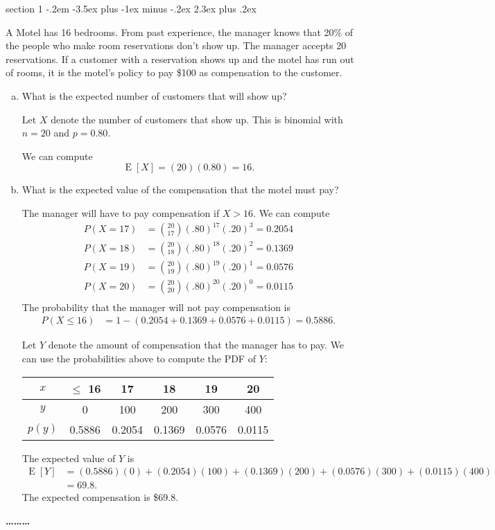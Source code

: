 \documentclass[answers,11pt]{exam}
\makeatletter
\DeclareMathOperator*{\E}{E}
\newenvironment{problem}{\@startsection
       {section}
       {1}
       {-.2em}
       {-3.5ex plus -1ex minus -.2ex}
       {2.3ex plus .2ex}
       {\pagebreak[3]%
       \large\bf\noindent{Problem }
       }
       }
       {%
       \begin{center}\large\bf \ldots\ldots\ldots\end{center}}
\makeatother
\begin{document}
\newpage
\begin{problem}{}

A Motel has 16 bedrooms. From past experience, the manager knows that 20\% of
the people who make room reservations don't show up. The manager accepts 20
reservations. If a customer with a reservation shows up and the motel has run
out of rooms, it is the motel's policy to pay \$100 as compensation to the
customer. 
\begin{enumerate}[(a)]
\item What is the expected number of customers that will show up? 
\begin{solution}
Let $X$ denote the number of customers that show up.  This is binomial with $n
= 20$ and $p = 0.80$.  

We can compute
\[
\E [X] = (20)(0.80) = 16.
\]
\end{solution}

\item What is the expected value of the compensation that the motel must pay?
\begin{solution}
The manager will have to pay compensation if $X > 16$.
We can compute
\begin{align*}
  P(X = 17) &= \binom{20}{17} (.80)^{17} (.20)^3 = 0.2054\\
  P(X = 18) &= \binom{20}{18} (.80)^{18} (.20)^2 = 0.1369\\
  P(X = 19) &= \binom{20}{19} (.80)^{19} (.20)^1 = 0.0576\\
  P(X = 20) &= \binom{20}{20} (.80)^{20} (.20)^0 = 0.0115\\
\end{align*}
The probability that the manager will not pay compensation is
\begin{align*}
  P(X \leq 16)
    &= 1 - (0.2054 + 0.1369 + 0.0576 + 0.0115)
    = 0.5886.
\end{align*}

Let $Y$ denote the amount of compensation that the
manager has to pay.  We can use the probabilities above to compute the PDF of
$Y$:

\begin{center}
\begin{tabular}{c|ccccc}
$x$    &      $\leq$ 16 &    17&    18&    19&    20\\\hline
$y$    &      0 &    100 &    200 &    300 &    400  \\
\hline
$p(y)$ & 0.5886 & 0.2054 & 0.1369 & 0.0576 & 0.0115 
\end{tabular}
\end{center}

The expected value of $Y$ is
\begin{align*}
  \E[Y] &= 
    (0.5886)(0)
    + (0.2054)(100)
    + (0.1369)(200)
    + (0.0576)(300)
    + (0.0115)(400)\\
    &= 69.8.
\end{align*}
The expected compensation is \$69.8.


\end{solution}

\end{enumerate}
\end{problem}
\end{document}
